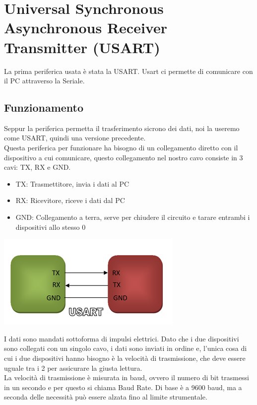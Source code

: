 \pagebreak
\section{Universal Synchronous Asynchronous Receiver Transmitter (USART)}
La prima periferica usata è stata la USART. Usart ci permette di comunicare con il PC attraverso la Seriale.
\\

\subsection{Funzionamento}
Seppur la periferica permetta il trasferimento sicrono dei dati, noi la useremo come USART, quindi una versione precedente.\\

Questa periferica per funzionare ha bisogno di un collegamento diretto con il dispositivo a cui comunicare, questo collegamento nel nostro cavo consiste in 3 cavi: TX, RX e GND.\\


\noindent
\begin{minipage}[c]{0.54\linewidth}
    \begin{itemize}
        \item TX: Trasmettitore, invia i dati al PC
        \item RX: Ricevitore, riceve i dati dal PC
        \item GND: Collegamento a terra, serve per chiudere il circuito e tarare entrambi i dispositivi allo stesso 0
    \end{itemize}
\end{minipage}
\hfill
\begin{minipage}[t]{0.4\linewidth}

    \centering
    \includegraphics[width=0.7\linewidth]{microcontrollore/assets/USART.png}
    \label{fig:USART}
\end{minipage}

I dati sono mandati sottoforma di impulsi elettrici. Dato che i due dispositivi sono collegati con un singolo cavo, i dati sono inviati in ordine e, l'unica cosa di cui i due dispositivi hanno bisogno è la velocità di trasmissione, che deve essere uguale tra i 2 per assicurare la giusta lettura.\\
La velocità di trasmissione è misurata in baud, ovvero il numero di bit trasmessi in un secondo e per questo si chiama Baud Rate. Di base è a 9600 baud, ma a seconda delle necessità può essere alzata fino al limite strumentale.\\

